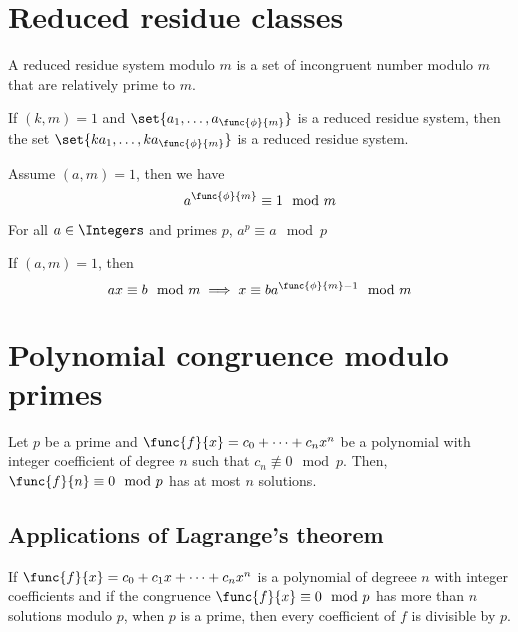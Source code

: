 \section{Reduced residue classes}
\begin{definition}
    A reduced residue system modulo \(m\) is a set of incongruent number modulo \(m\) that are relatively prime to \(m\).
\end{definition}

\begin{theorem}
    If \((k,m) = 1\) and \(\set{a_1,\dots,a_{\func{\phi}{m}}}\) is a reduced residue system, then the set \(\set{ka_1,\dots, k a_{\func{\phi}{m}}}\) is a reduced residue system.
\end{theorem}

\begin{theorem}
    Assume \((a,m) = 1\), then we have 
    \begin{equation*}
        a^{\func{\phi}{m}} \equiv 1 \mod m
    \end{equation*}
\end{theorem}

\begin{theorem}
    For all \(a \in \Integers\) and primes \(p\), \(a^p \equiv a \mod p\)
\end{theorem}

\begin{corollary}
    If \((a,m) = 1\), then 
    \begin{equation*}
        ax \equiv b \mod m \implies x \equiv b a^{\func{\phi}{m} - 1} \mod m
    \end{equation*}
\end{corollary}

\section{Polynomial congruence modulo primes}
\begin{theorem}
    Let \(p\) be a prime and \(\func{f}{x} = c_0 + \dots + c_n x^n\) be a polynomial with integer coefficient of degree \(n\) such that \(c_n \not\equiv 0 \mod p\). Then, \(\func{f}{n} \equiv 0 \mod p\) has at most \(n\) solutions.
\end{theorem}

\subsection{Applications of Lagrange's theorem}
\begin{theorem}
    If \(\func{f}{x} = c_0 + c_1x + \dots + c_nx^n\) is a polynomial of degreee \(n\) with integer coefficients and if the congruence \(\func{f}{x} \equiv 0 \mod p\) has more than \(n\) solutions modulo \(p\), when \(p\) is a prime, then every coefficient of \(f\) is divisible by \(p\). 
\end{theorem}

